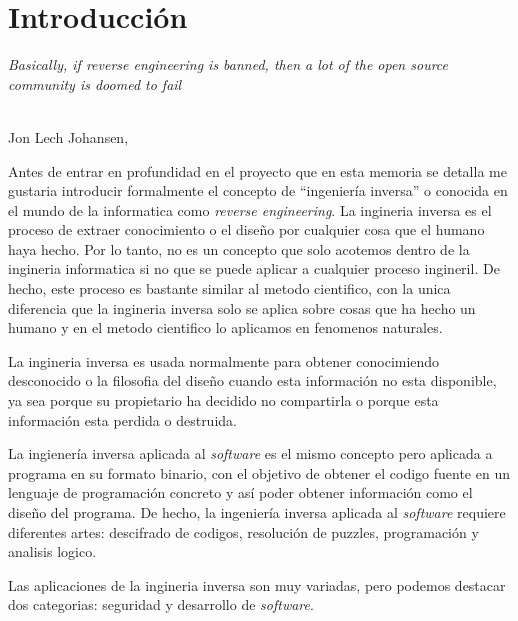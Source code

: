 \chapter{Introducción}
\label{cap:introducion}

\setcounter{page}{1}

\begin{flushright}
    \begin{minipage}[]{10cm}
        \emph{Basically, if reverse engineering is banned, then a lot of the open source community is doomed to fail}\\
    \end{minipage}\\

    Jon Lech Johansen, \textit{}\\
\end{flushright}

\vspace{1cm}

Antes de entrar en profundidad en el proyecto que en esta memoria se detalla me gustaria introducir formalmente el concepto de ``ingeniería inversa'' o conocida en el mundo de la
informatica como \textit{reverse engineering}. La ingineria inversa es el proceso de extraer conocimiento o el diseño por cualquier cosa que el humano haya hecho. Por lo tanto,
no es un concepto que solo acotemos dentro de la ingineria informatica si no que se puede aplicar a cualquier proceso ingineril. De hecho, este proceso es bastante similar al
metodo cientifico, con la unica diferencia que la ingineria inversa solo se aplica sobre cosas que ha hecho un humano y en el metodo cientifico lo aplicamos en fenomenos
naturales.

La ingineria inversa es usada normalmente para obtener conocimiendo desconocido o la filosofia del diseño cuando esta información no esta disponible, ya sea porque su propietario
ha decidido no compartirla o porque esta información esta perdida o destruida. \cite{alma991003132729706711}

La ingienería inversa aplicada al \textit{software} es el mismo concepto pero aplicada a programa en su formato binario, con el objetivo de obtener el codigo fuente en un lenguaje
de programación concreto y así poder obtener información como el diseño del programa. De hecho, la ingeniería inversa aplicada al \textit{software} requiere diferentes artes:
descifrado de codigos, resolución de puzzles, programación y analisis logico.

Las aplicaciones de la ingineria inversa son muy variadas, pero podemos destacar dos categorias: seguridad y desarrollo de \textit{software}.

